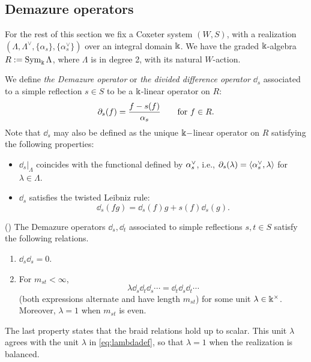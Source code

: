 \subsection{Demazure operators}
\label{subsec-demazures}

For the rest of this section we fix a Coxeter system $(W,S)$, with a realization $(\Lambda,  \Lambda^\vee,\{\alpha_s\},\{\alpha_s^\vee\})$ over an integral domain $\Bbbk$. We have the graded $\Bbbk$-algebra $R:= \operatorname{Sym}_{\Bbbk} \Lambda$, where $\Lambda$ is in degree 2, with its natural $W$-action.

We define \emph{the Demazure operator} or \emph{the divided difference operator} $\dd_s$ associated to a simple reflection $s\in S$ to be a $\Bbbk$-linear operator on $R$:
$$\partial_s(f)= \frac{f-s(f)}{\alpha_s} \text{\hspace{20 pt}for $f\in R$}.$$
Note that $\dd_s$ may also be defined as the unique $\Bbbk-$linear operator on $R$ satisfying the following properties:
\begin{itemize}
    \item $\dd_s|_{\Lambda}$ coincides with the functional defined by $\alpha_s^\vee$, i.e., $\partial_s(\lambda)=\langle\alpha_s^\vee,\lambda\rangle$ for $\lambda \in \Lambda$.
    \item $\dd_s$ satisfies the twisted Leibniz rule:
    \begin{equation}\label{eq twisted leibniz}
        \dd_s(fg)=\dd_s(f)g+s(f)\dd_s(g).
    \end{equation}
\end{itemize}

\begin{lemma}\label{lemma demazure operators coxeter relations}
    (\cite[Claim A.7]{ECathedral}) The Demazure operators $\dd_s, \dd_t$ associated to simple reflections $s,t \in S$ satisfy the following relations.
    \begin{enumerate}
        \item $\dd_s\dd_s=0$.
        \item For $m_{st} < \infty$, 
    \begin{equation} \label{eq:rescaled braid} \lambda \dd_s \dd_t \dd_s \cdots = \dd_t \dd_s \dd_t \cdots \end{equation} (both expressions alternate and have length $m_{st}$) for some unit $\lambda \in \Bbbk^\times$. Moreover, $\lambda=1$ when $m_{st}$ is even.
    \end{enumerate}
The last property states that the braid relations hold up to scalar. This unit $\lambda$ agrees with the unit $\lambda$ in \eqref{eq:lambdadef}, so that $\lambda = 1$ when the realization is balanced.
\end{lemma}


